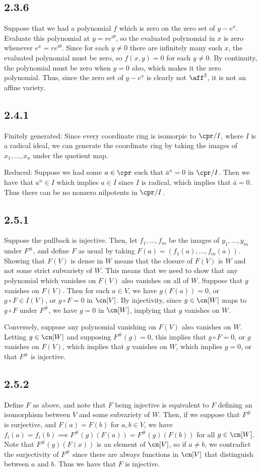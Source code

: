 \documentclass{article}
\begin{document}
\subsection*{2.3.6}
Suppose that we had a polynomial $f$ which is zero on the zero set of $y-e^x$. Evaluate this polynomial at $y=re^{i\theta}$, so the evaluated polynomial in $x$ is zero whenever $e^x=re^{i\theta}$. Since for each $y\neq0$ there are infinitely many such $x$, the evaluated polynomial must be zero, so $f(x,y)=0$ for each $y\neq 0$. By continuity, the polynomial must be zero when $y=0$ also, which makes it the zero polynomial. Thus, since the zero set of $y-e^x$ is clearly not $\aff^2$, it is not an affine variety.
\subsection*{2.4.1}
Finitely generated: Since every coordinate ring is isomorpic to $\cpr/I$, where $I$ is a radical ideal, we can generate the coordinate ring by taking the images of $x_1,\ldots,x_n$ under the quotient map.

Reduced: Suppose we had some $a\in\cpr$ such that $\bar{a}^n=0$ in $\cpr/I$. Then we have that $a^n\in I$ which implies $a\in I$ since $I$ is radical, which implies that $\bar{a}=0$. Thus there can be no nonzero nilpotents in $\cpr/I$.
\subsection*{2.5.1}
Suppose the pullback is injective. Then, let $f_1,\ldots,f_m$ be the images of $y_1,\ldots,y_m$ under $F^\#$, and define $F$ as usual by taking $F(a)=(f_1(a),\ldots,f_m(a))$. Showing that $F(V)$ is dense in $W$ means that the closure of $F(V)$ is $W$ and not some strict subvariety of $W$. This means that we need to show that any polynomial which vanishes on $F(V)$ also vanishes on all of $W$. Suppose that $g$ vanishes on $F(V)$. Then for each $a\in V$, we have $g(F(a))=0$, or $g\circ F\in I(V)$, or $g\circ F=0$ in $\cn[V]$. By injectivity, since $g\in\cn[W]$ maps to $g\circ F$ under $F^\#$, we have $g=0$ in $\cn[W]$, implying that $g$ vanishes on $W$.

Conversely, suppose any polynomial vanishing on $F(V)$ also vanishes on $W$. Letting $g\in\cn[W]$ and supposing $F^\#(g)=0$, this implies that $g\circ F=0$, or $g$ vanishes on $F(V)$, which implies that $g$ vanishes on $W$, which implies $g=0$, or that $F^\#$ is injective.
\subsection*{2.5.2}
Define $F$ as above, and note that $F$ being injective is equivalent to $F$ defining an isomorphism between $V$ and some subvariety of $W$. Then, if we suppose that $F^\#$ is surjective, and $F(a)=F(b)$ for $a,b\in V$, we have $f_i(a)=f_i(b)\implies F^\#(g)(F(a))=F^\#(g)(F(b))$ for all $g\in\cn[W]$. Note that $F^\#(g)(F(x))$ is an element of $\cn[V]$, so if $a\neq b$, we contradict the surjectivity of $F^\#$ since there are always functions in $\cn[V]$ that distinguish between $a$ and $b$. Thus we have that $F$ is injective.
\end{document}
